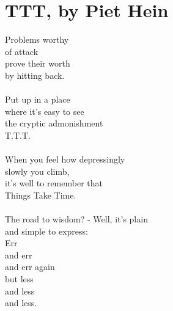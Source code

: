 \section{TTT, by Piet Hein}
Problems worthy \\
of attack \\
prove their worth \\
by hitting back. \\
\\
Put up in a place \\
where it's easy to see \\
the cryptic admonishment\\
    T.T.T. \\
\\
When you feel how depressingly \\
slowly you climb, \\
it's well to remember that\\
Things Take Time. \\
\\
The road to wisdom? - Well, it's plain\\
and simple to express: \\
   Err \\
   and err \\
   and err again \\ 
   but less \\
   and less \\
   and less. \\
